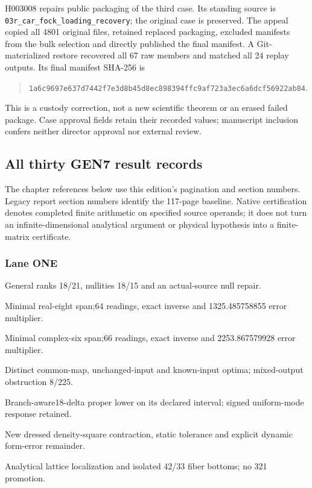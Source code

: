 H003008 repairs public packaging of the third case. Its standing source is
\texttt{03r\_car\_fock\_loading\_recovery}; the original case is preserved.
The appeal copied all 4801 original files, retained replaced packaging,
excluded manifests from the bulk selection and directly published the
final manifest. A Git-materialized restore recovered all 67 raw members and
matched all 24 replay outputs. Its final manifest SHA-256 is
\begin{quote}\small\nolinkurl{1a6c9697e637d7442f7e3d8b45d8ec898394ffc9af723a3ec6a6dcf56922ab84}.\end{quote}
This is a custody correction, not a new scientific theorem or an erased
failed package. Case approval fields retain their recorded values;
manuscript inclusion confers neither director approval nor external review.

\subsection{All thirty GEN7 result records}
The chapter references below use this edition's pagination and section
numbers. Legacy report section numbers identify the 117-page baseline.
Native certification denotes completed finite arithmetic on specified
source operands; it does not turn an infinite-dimensional analytical
argument or physical hypothesis into a finite-matrix certificate.
\subsubsection{Lane ONE}
\begin{description}[style=nextline,leftmargin=0pt,labelsep=0pt]
\item[\texttt{ONE-T1} --- Section~\ref{sec:general-tomography-12}] General ranks 18/21, nullities 18/15 and an actual-source null repair.
\item[\texttt{ONE-T2} --- Section~\ref{sec:general-tomography-12}] Minimal real-eight span;64 readings, exact inverse and 1325.485758855 error multiplier.
\item[\texttt{ONE-T3} --- Section~\ref{sec:general-tomography-12}] Minimal complex-six span;66 readings, exact inverse and 2253.867579928 error multiplier.
\item[\texttt{ONE-A} --- Section~\ref{sec:arrival-optima-12}] Distinct common-map, unchanged-input and known-input optima; mixed-output obstruction 8/225.
\item[\texttt{ONE-R} --- Section~\ref{sec:robustness-12}] Branch-aware18-delta proper lower on its declared interval; signed uniform-mode response retained.
\item[\texttt{ONE-D} --- Section~\ref{sec:robustness-12}] New dressed density-square contraction, static tolerance and explicit dynamic form-error remainder.
\item[\texttt{ONE-F} --- Section~\ref{sec:fiber-12}] Analytical lattice localization and isolated 42/33 fiber bottoms; no 321 promotion.
\end{description}
